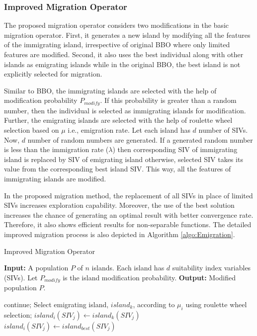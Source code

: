 \subsubsection{Improved Migration Operator}\label{sec: BMO}
The proposed migration operator considers two modifications in the basic migration operator. First, it generates a new island by modifying all the features of the immigrating island, irrespective of original BBO where only limited features are modified. Second, it also uses the best individual along with other islands as emigrating islands while in the original BBO, the best island is not explicitly selected for migration. 

Similar to BBO, the immigrating islands are selected with the help of modification probability $P_{modify}$. If this probability is greater than a random number, then the individual is selected as immigrating islands for modification. Further, the emigrating islands are selected with the help of roulette wheel selection based on $\mu$ i.e., emigration rate. Let each island has $d$ number of SIVs. Now, $d$ number of random numbers are generated. If a generated random number is less than the immigration rate ($\lambda$) then corresponding SIV of immigrating island is replaced by SIV of emigrating island otherwise, selected SIV takes its value from the corresponding best island SIV. This way, all the features of immigrating islands are modified.

In the proposed migration method, the replacement of all SIVs in place of limited SIVs increases exploration capability. Moreover, the use of the best solution increases the chance of generating an optimal result with better convergence rate. Therefore, it also shows efficient results for non-separable functions. The detailed improved migration process is also depicted in Algorithm \ref{algo:Emigration}.


\begin{algorithm}
\caption{\fontsize{10}{12} \selectfont Improved Migration Operator}
\label{algo:Emigration}
\footnotesize
\begin{algorithmic}
\STATE \textbf{Input:} A population $P$ of $n$ islands. Each island has $d$ suitability index variables (SIVs).
\STATE Let $P_{modify}$ is the island modification probability.
    \STATE \textbf{Output: } Modified population $P$.

    \STATE    continue;
  \ENDIF
        \STATE Select emigrating island, $island_k$, according to $\mu_i$ using roulette wheel selection;
           \STATE  $island_i(SIV_j) \leftarrow island_k(SIV_j)$
    \ELSE
         \STATE $island_i(SIV_j) \leftarrow island_{best}(SIV_j)$
     
    \ENDIF
\ENDFOR
\ENDFOR
\end{algorithmic}
\end{algorithm}


